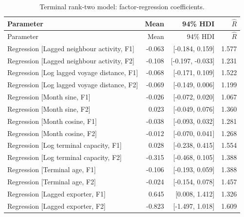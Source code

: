 \documentclass[pdftex,12pt,openright,a4paper,oneside]{book}
\begin{document}
\begin{longtable}{@{}p{}rrr@{}}
\caption{Terminal rank-two model: factor-regression coefficients.}\label{tab:terminal_rank2_3}\\
\toprule
Parameter & Mean & 94\% HDI & $\widehat R$ \\
\midrule\endfirsthead
\toprule
Parameter & Mean & 94\% HDI & $\widehat R$ \\
\midrule\endhead
Regression [Lagged neighbour activity, F1] & -0.063 & [-0.184, 0.159] & 1.577 \\

Regression [Lagged neighbour activity, F2] & -0.108 & [-0.197, -0.033] & 1.231 \\

Regression [Log lagged voyage distance, F1] & -0.068 & [-0.171, 0.109] & 1.522 \\

Regression [Log lagged voyage distance, F2] & -0.069 & [-0.149, 0.006] & 1.199 \\

Regression [Month sine, F1] & -0.026 & [-0.072, 0.020] & 1.067 \\

Regression [Month sine, F2] & 0.023 & [-0.049, 0.076] & 1.360 \\

Regression [Month cosine, F1] & -0.038 & [-0.093, 0.032] & 1.281 \\

Regression [Month cosine, F2] & -0.012 & [-0.070, 0.041] & 1.268 \\

Regression [Log terminal capacity, F1] & 0.028 & [-0.238, 0.415] & 1.554 \\

Regression [Log terminal capacity, F2] & -0.315 & [-0.468, 0.105] & 1.388 \\

Regression [Terminal age, F1] & -0.106 & [-0.193, 0.059] & 1.388 \\

Regression [Terminal age, F2] & -0.024 & [-0.154, 0.078] & 1.457 \\

Regression [Lagged exporter, F1] & 0.645 & [0.008, 1.412] & 1.326 \\

Regression [Lagged exporter, F2] & -0.823 & [-1.497, 1.018] & 1.609 \\

\bottomrule\end{longtable}
\end{document}
